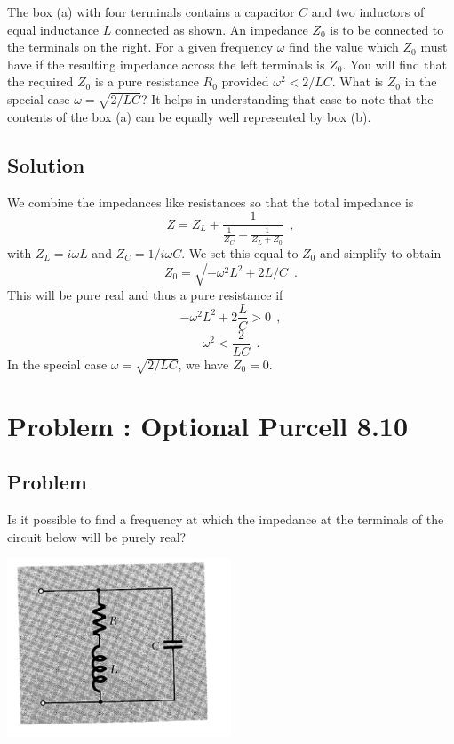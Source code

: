 \documentclass[solutions]{esg8022pset}
\begin{document}
  \noindent The box (a) with four terminals contains a capacitor $C$ and
  two inductors of equal inductance $L$ connected as shown.  An impedance
  $Z_0$ is to be connected to the terminals on the right. For a given
  frequency $\omega$ find the value which $Z_0$ must have if the resulting
  impedance across the left terminals is $Z_0$. You will find that the
  required $Z_0$ is a pure resistance $R_0$ provided $\omega^2<2/LC$. What
  is $Z_0$ in the special case $\omega = \sqrt{2/LC}$?  It helps in
  understanding that case to note that the contents of the box (a) can be
  equally well represented by box (b).
\subsection{Solution}
  We combine the impedances like resistances so that the total impedance is
  \[ Z = Z_L + \frac{1}{\frac{1}{Z_C} + \frac{1}{Z_L + Z_0}}\ \ , \]
  with $Z_L = i\omega L$ and $Z_C = 1/i\omega C$. We set this equal to $Z_0$ and simplify to obtain
  \[ Z_0 = \sqrt{-\omega^2L^2 + 2L/C}\ \ .\]
  This will be pure real and thus a pure resistance if
  \[ -\omega^2L^2 + 2\frac{L}{C} >0 \ \ ,\]
  \[ \omega^2 < \frac{2}{LC}\ \ .\]
  In the special case $\omega = \sqrt{2/LC}$, we have $Z_0=0$.
\section{Problem \thesection: Optional Purcell 8.10}
\subsection{Problem}
  Is it possible to find a frequency at which the impedance at the
  terminals of the circuit below will be purely real?

  \begin{center}
    \includegraphics[width = 0.5\textwidth]{figpu810}
  \end{center}
\end{document}
